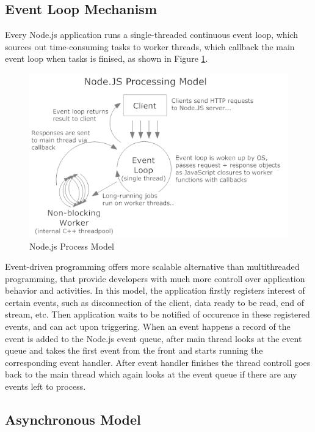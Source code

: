 \subsection{Event Loop Mechanism} %
\label{sub:event_loop_mechanism}
Every Node.js application runs a single-threaded continuous event loop, which sources out time-consuming tasks to worker threads, which callback the main event loop when tasks is finised, as shown in Figure \ref{fig:node_js_model}.
\begin{figure}[H]
\begin{center}
\captionsetup{font=small}
\includegraphics[scale=0.8]{pics/node_js_model.png}
\caption{Node.js Process Model}
\label{fig:node_js_model}
\end{center}
\end{figure}
Event-driven programming offers more scalable alternative than multithreaded programming, that provide developers with much more controll over application behavior and activities. In this model, the application firstly registers interest of certain events, such as disconnection of the client, data ready to be read, end of stream, etc. Then application waits to be notified of occurence in these registered events, and can act upon triggering. \cite{7073454} When an event happens a record of the event is added to the Node.js event queue, after main thread  looks at the event queue and takes the first event from the front and starts running the corresponding event handler. After event handler finishes the thread controll goes back to the main thread which again looks at the event queue if there are any events left to process.\cite{5617064}
\subsection{Asynchronous Model} %
\label{sub:asynchronous_code}
